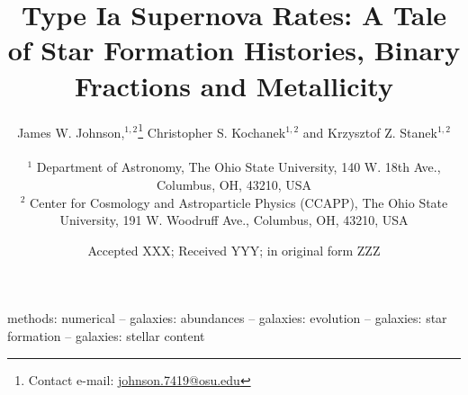 \documentclass[fleqn, usenatbib]{mnras}
\title[Type Ia Supernova Rates]{Type Ia Supernova Rates: A Tale of Star
Formation Histories, Binary Fractions and Metallicity}
\author[J.W. Johnson, C.S. Kochanek \& K.Z. Stanek]{
	James W. Johnson,$^{1, 2}$\thanks{
		Contact e-mail: \href{mailto:johnson.7419@osu.edu}{johnson.7419@osu.edu}
	}
	Christopher S. Kochanek$^{1, 2}$ and
	Krzysztof Z. Stanek$^{1, 2}$
	\\ \null \\
	$^{1}$ Department of Astronomy, The Ohio State University,
	140 W. 18th Ave., Columbus, OH, 43210, USA
	\\
	$^{2}$ Center for Cosmology and Astroparticle Physics (CCAPP),
	The Ohio State University, 191 W. Woodruff Ave., Columbus, OH, 43210, USA
}
\date{Accepted XXX; Received YYY; in original form ZZZ}
\begin{document}
\label{firstpage}
\pagerange{\pageref{firstpage}--\pageref{lastpage}}
\maketitle

\begin{keywords}
methods: numerical -- galaxies: abundances -- galaxies: evolution --
galaxies: star formation -- galaxies: stellar content
\end{keywords}








\label{lastpage}
\end{document}
